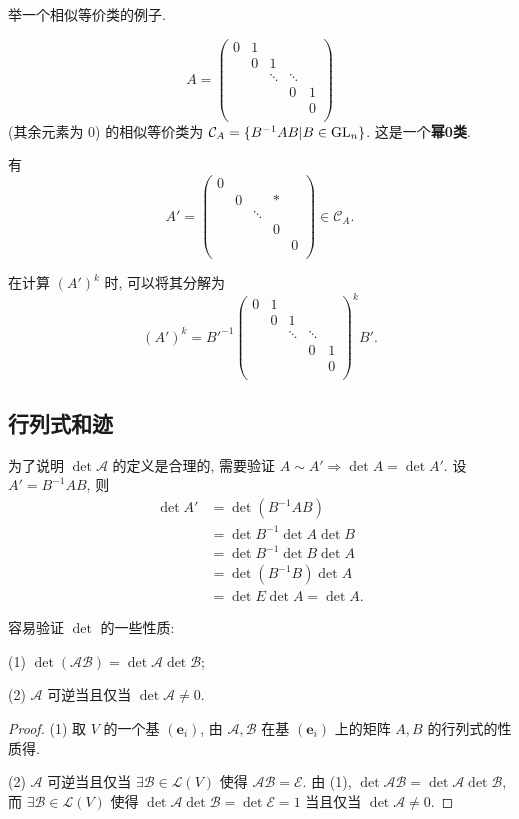 \documentclass[color=black,device=normal,lang=cn,mode=geye]{elegantnote}
\begin{document}
举一个相似等价类的例子.
\begin{example}
    \[A=\begin{pmatrix}
        0 & 1 \\
        & 0 & 1 \\
        && \ddots & \ddots \\
        &&& 0 & 1 \\
        &&&& 0 \\
    \end{pmatrix}\]
    (其余元素为 $0$) 的相似等价类为 $\mathcal{C}_A=\{B^{-1}AB|B\in\operatorname{GL} _n\}$. 这是一个\textbf{幂0类}.

    有
    \[A'=\begin{pmatrix}
        0 \\
        & 0 && * \\
        && \ddots \\
        &&& 0 \\
        &&&& 0 \\
    \end{pmatrix}\in\mathcal{C}_A.\]

    在计算 $(A')^k$ 时, 可以将其分解为
    \[(A')^k=B'^{-1}\begin{pmatrix}
        0 & 1 \\
        & 0 & 1 \\
        && \ddots & \ddots \\
        &&& 0 & 1 \\
        &&&& 0 \\
    \end{pmatrix}^kB'.\]
\end{example}
\subsection{行列式和迹}
为了说明 $\det\mathcal{A}$ 的定义是合理的, 需要验证 $A\sim A'\Rightarrow\det A=\det A'$. 设 $A'=B^{-1}AB$, 则
\begin{align*}
    \det A' & =\det(B^{-1}AB) \\
    & =\det B^{-1}\det A\det B \\
    & =\det B^{-1}\det B\det A \\
    & =\det(B^{-1}B)\det A \\
    & =\det E\det A=\det A.
\end{align*}

容易验证 $\det$ 的一些性质:
\begin{property}
    (1) $\det(\mathcal{AB})=\det\mathcal{A}\det\mathcal{B}$;

    (2) $\mathcal{A}$ 可逆当且仅当 $\det\mathcal{A}\neq0$.
\end{property}
\begin{proof}
    (1) 取 $V$ 的一个基 $(\boldsymbol{e}_i)$, 由 $\mathcal{A},\mathcal{B}$ 在基 $(\boldsymbol{e}_i)$ 上的矩阵 $A,B$ 的行列式的性质得.

    (2) $\mathcal{A}$ 可逆当且仅当 $\exists\mathcal{B}\in\mathcal{L}(V)$ 使得 $\mathcal{AB}=\mathcal{E}$. 由 (1), $\det\mathcal{AB}=\det\mathcal{A}\det\mathcal{B}$, 而 $\exists\mathcal{B}\in\mathcal{L}(V)$ 使得 $\det\mathcal{A}\det\mathcal{B}=\det\mathcal{E}=1$ 当且仅当 $\det\mathcal{A}\neq0$.
\end{proof}
\end{document}
